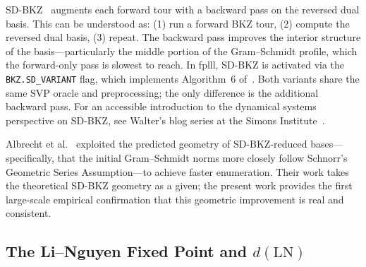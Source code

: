 \documentclass[journal=cic,version=preprint]{iacrj}
\begin{document}
SD-BKZ~\cite{EC:MicWal16} augments each forward tour with a backward pass on the reversed dual basis. This can be understood as: (1) run a forward BKZ tour, (2) compute the reversed dual basis, (3) repeat. The backward pass improves the interior structure of the basis---particularly the middle portion of the Gram--Schmidt profile, which the forward-only pass is slowest to reach. In fplll, SD-BKZ is activated via the \texttt{BKZ.SD\_VARIANT} flag, which implements Algorithm~6 of~\cite{EC:MicWal16}. Both variants share the same SVP oracle and preprocessing; the only difference is the additional backward pass. For an accessible introduction to the dynamical systems perspective on SD-BKZ, see Walter's blog series at the Simons Institute~\cite{Walter20blog}.

Albrecht et al.~\cite{C:ABFKSW20} exploited the predicted geometry of SD-BKZ-reduced bases---specifically, that the initial Gram--Schmidt norms more closely follow Schnorr's Geometric Series Assumption---to achieve faster enumeration. Their work takes the theoretical SD-BKZ geometry as a given; the present work provides the first large-scale empirical confirmation that this geometric improvement is real and consistent.

\subsection{The Li--Nguyen Fixed Point and $d(\mathrm{LN})$}
\end{document}
